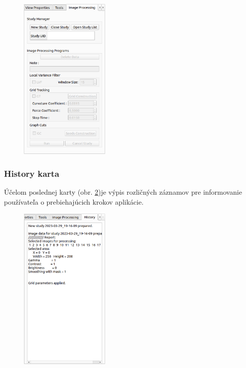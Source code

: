 {\begin {figure}[H]
        \centering
        \includegraphics[height=8cm]{media/existing_app/tabs/image_processing_inactive.png}
        \captionsetup{justification=centering}
        \label{fig:image_processing_tab}
\end {figure}

\subsubsection {History karta}
Účelom poslednej karty  (obr. \ref{fig:history_card})je výpis rozličných záznamov pre informovanie používateľa o prebiehajúcich krokov aplikácie.

\begin {figure}[H]
        \centering
        \includegraphics[height=8cm]{media/existing_app/tabs/history.png}
        \captionsetup{justification=centering}
        \label{fig:history_card}
\end {figure}

}
